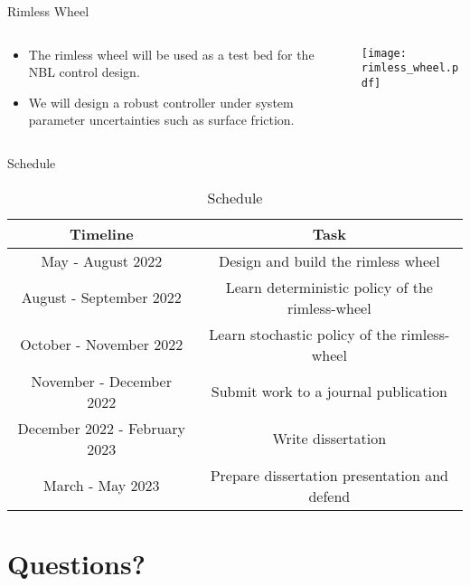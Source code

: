 \begin{frame}{Rimless Wheel}
    \begin{columns}
        \begin{column}{0.4\linewidth}
            \begin{itemize}
               \item The rimless wheel will be used as a test bed for the NBL control design. \\
               \item We will design a robust controller under system parameter uncertainties such as surface friction. 
            \end{itemize}
        \end{column}
        \begin{column}{0.5\linewidth}
            \texttt{[image: rimless\_wheel.pdf]}
        \end{column}
        \end{columns}
\end{frame}

\begin{frame}{Schedule}
    \begin{table}[H]
        \centering
        \caption{Schedule}
        \begin{tabular}{|c|c|}
        \toprule
        \textbf{Timeline} & \textbf{Task} \\
        \midrule 
        \midrule
            May - August 2022 & Design and build the rimless wheel \\
            August - September 2022 & Learn deterministic policy of the rimless-wheel \\ 
            October - November 2022 & Learn stochastic policy of the rimless-wheel \\
            November - December 2022 & Submit work to a journal publication \\
            December 2022 - February 2023 & Write dissertation \\
            March - May 2023 & Prepare dissertation presentation and defend \\
        \bottomrule
        \end{tabular}
        \label{tab:training_setup_neuralpbc}
    \end{table}
\end{frame}

\section{Questions?}
